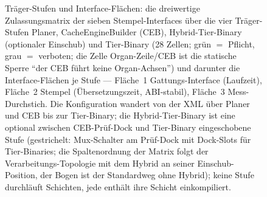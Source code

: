 \begin{nurkurz}
\begin{figure}[htbp]
\caption{Träger-Stufen und Interface-Flächen: die dreiwertige Zulassungsmatrix der sieben Stempel-Interfaces über die vier Träger-Stufen Planer, CacheEngineBuilder (CEB), Hybrid-Tier-Binary (optionaler Einschub) und Tier-Binary (28 Zellen; grün $=$ Pflicht, grau $=$ verboten; die Zelle Organ-Zeile/CEB ist die statische Sperre \enquote{der CEB führt keine Organ-Achsen}) und darunter die Interface-Flächen je Stufe --- Fläche~1 Gattungs-Interface (Laufzeit), Fläche~2 Stempel (Übersetzungszeit, ABI-stabil), Fläche~3 Mess-Durchstich. Die Konfiguration wandert von der XML über Planer und CEB bis zur Tier-Binary; die Hybrid-Tier-Binary ist eine optional zwischen CEB-Prüf-Dock und Tier-Binary eingeschobene Stufe (gestrichelt: Mux-Schalter am Prüf-Dock mit Dock-Slots für Tier-Binaries; die Spaltenordnung der Matrix folgt der Verarbeitungs-Topologie mit dem Hybrid an seiner Einschub-Position, der Bogen ist der Standardweg ohne Hybrid); keine Stufe durchläuft Schichten, jede enthält ihre Schicht einkompiliert.}\label{fig:traeger-flaechen}
\end{figure}
\end{nurkurz}

